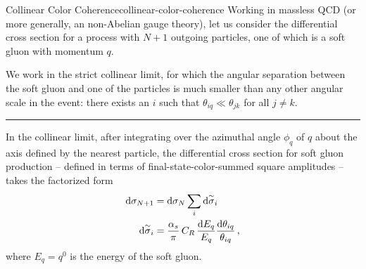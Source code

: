 \begin{lemma}{Collinear Color Coherence}{collinear-color-coherence}
    Working in massless QCD (or more generally, an non-Abelian gauge theory), let us consider the differential cross section for a process with \(N+1\) outgoing particles, one of which is a soft gluon with momentum \(q\).

    We work in the strict collinear limit, for which the angular separation between the soft gluon and one of the particles is much smaller than any other angular scale in the event:
    there exists an \(i\) such that \(\theta_{iq} \ll \theta_{jk}\) for all \(j \neq k\).

    \vspace{7pt}
    \hrule
    \vspace{7pt}

    In the collinear limit, after integrating over the azimuthal angle \(\phi_{q}\) of \(q\) about the axis defined by the nearest particle, the differential cross section for soft gluon production -- defined in terms of final-state-color-summed square amplitudes -- takes the factorized form
    \begin{align}
        \label{eq:soft-gluon-factorization}
        \dd \sigma_{N+1}
        &=
        \dd\sigma_N
        \sum_i\dsigmatilde_i
        \\
        \label{eq:soft-gluon-splitting-probability}
        \dsigmatilde_i
        &=
        \frac{\alpha_s}{\pi}
        \,
        C_R
        \,
        \frac{\dd E_q}{E_q}
        \frac{\dd\theta_{iq}}{\theta_{iq}}
        \,,
    \end{align}
    where \(E_q = q^0\) is the energy of the soft gluon.
\end{lemma}


